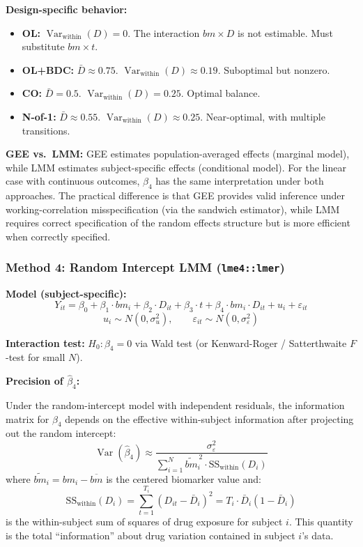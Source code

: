 \documentclass[11pt,letterpaper]{article}
\begin{document}
\textbf{Design-specific behavior:}
\begin{itemize}[nosep]
\item \textbf{OL:} $\operatorname{Var}_{\text{within}}(D) = 0$. The
  interaction $bm \times D$ is not estimable. Must substitute
  $bm \times t$.
\item \textbf{OL+BDC:} $\bar{D} \approx 0.75$.
  $\operatorname{Var}_{\text{within}}(D) \approx 0.19$. Suboptimal but
  nonzero.
\item \textbf{CO:} $\bar{D} = 0.5$.
  $\operatorname{Var}_{\text{within}}(D) = 0.25$. Optimal balance.
\item \textbf{N-of-1:} $\bar{D} \approx 0.55$.
  $\operatorname{Var}_{\text{within}}(D) \approx 0.25$. Near-optimal,
  with multiple transitions.
\end{itemize}

\textbf{GEE vs.\ LMM:} GEE estimates population-averaged effects
(marginal model), while LMM estimates subject-specific effects
(conditional model). For the linear case with continuous outcomes,
$\beta_4$ has the same interpretation under both approaches. The
practical difference is that GEE provides valid inference under
working-correlation misspecification (via the sandwich estimator), while
LMM requires correct specification of the random effects structure but
is more efficient when correctly specified.

\subsubsection{Method 4: Random Intercept LMM (\texttt{lme4::lmer})}

\textbf{Model (subject-specific):}
\[
Y_{it} = \beta_0 + \beta_1 \cdot bm_i + \beta_2 \cdot D_{it}
+ \beta_3 \cdot t + \beta_4 \cdot bm_i \cdot D_{it}
+ u_i + \varepsilon_{it}
\]
\[
u_i \sim N(0, \sigma^2_u), \qquad
\varepsilon_{it} \sim N(0, \sigma^2_\varepsilon)
\]

\textbf{Interaction test:} $H_0: \beta_4 = 0$ via Wald test (or
Kenward-Roger / Satterthwaite $F$-test for small $N$).

\textbf{Precision of $\hat{\beta}_4$:}

Under the random-intercept model with independent residuals, the
information matrix for $\beta_4$ depends on the effective within-subject
information after projecting out the random intercept:
\[
\operatorname{Var}(\hat{\beta}_4) \approx
\frac{\sigma^2_\varepsilon}{
\displaystyle\sum_{i=1}^{N} \widetilde{bm}_i^{\,2} \cdot
\text{SS}_{\text{within}}(D_i)}
\]
where $\widetilde{bm}_i = bm_i - \overline{bm}$ is the centered
biomarker value and:
\[
\text{SS}_{\text{within}}(D_i) =
\sum_{t=1}^{T_i} (D_{it} - \bar{D}_i)^2
= T_i \cdot \bar{D}_i (1 - \bar{D}_i)
\]
is the within-subject sum of squares of drug exposure for subject $i$.
This quantity is the total ``information'' about drug variation contained
in subject $i$'s data.
\end{document}
